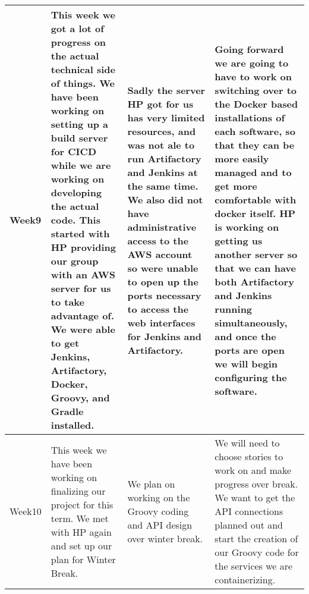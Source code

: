 \documentclass[onecolumn, draftclsnofoot,10pt, compsoc]{IEEEtran}
\begin{document}
\begin{center}
\begin{longtable}{ | m{4em} | m{12em}| m{12em} | m{12em} | }
\\ 
\hline
Week9&
This week we got a lot of progress on the actual technical side of things. We have been working on setting up a build server for CICD while we are working on developing the actual code. This started with HP providing our group with an AWS server for us to take advantage of. We were able to get Jenkins, Artifactory, Docker, Groovy, and Gradle installed.&
Sadly the server HP got for us has very limited resources, and was not ale to run Artifactory and Jenkins at the same time. We also did not have administrative access to the AWS account so were unable to open up the ports necessary to access the web interfaces for Jenkins and Artifactory.&
Going forward we are going to have to work on switching over to the Docker based installations of each software, so that they can be more easily managed and to get more comfortable with docker itself. HP is working on getting us another server so that we can have both Artifactory and Jenkins running simultaneously, and once the ports are open we will begin configuring the software.

\\ 
\hline
Week10&
This week we have been working on finalizing our project for this term. We met with HP again and set up our plan for Winter Break. 
&We plan on working on the Groovy coding and API design over winter break.
&We will need to choose stories to work on and make progress over break. We want to get the API connections planned out and start the creation of our Groovy code for the services we are containerizing. 

\\ 
\hline
\end{longtable}
\end{center}
  


\end{document}
